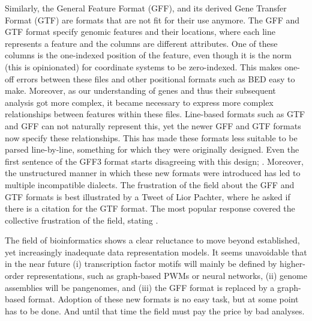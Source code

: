 Similarly, the General Feature Format (GFF), and its derived Gene Transfer Format (GTF) are formats that are not fit for their use anymore. The GFF and GTF format specify genomic features and their locations, where each line represents a feature and the columns are different attributes. One of these columns is the one-indexed position of the feature, even though it is the norm (this is opinionated) for coordinate systems to be zero-indexed\cite{utexasEWDijkstra}. This makes one-off errors between these files and other positional formats such as BED easy to make. Moreover, as our understanding of genes and thus their subsequent analysis got more complex, it became necessary to express more complex relationships between features within these files. Line-based formats such as GTF and GFF can not naturally represent this, yet the newer GFF and GTF formats now specify these relationships. This has made these formats less suitable to be parsed line-by-line, something for which they were originally designed. Even the first sentence of the GFF3 format starts disagreeing with this design; . Moreover, the unstructured manner in which these new formats were introduced has led to multiple incompatible dialects. The frustration of the field about the GFF and GTF formats is best illustrated by a Tweet of Lior Pachter, where he asked if there is a citation for the GTF format. The most popular response covered the collective frustration of the field, stating .

The field of bioinformatics shows a clear reluctance to move beyond established, yet increasingly inadequate data representation models. It seems unavoidable that in the near future (i) transcription factor motifs will mainly be defined by higher-order representations, such as graph-based PWMs\cite{Siebert2016} or neural networks\cite{Novakovsky2023,https://doi.org/10.48550/arxiv.1704.02685}, (ii) genome assemblies will be pangenomes, and (iii) the GFF format is replaced by a graph-based format. Adoption of these new formats is no easy task, but at some point has to be done. And until that time the field must pay the price by bad analyses.

